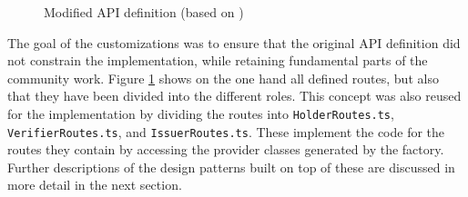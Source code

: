     \begin{figure}[ht]
        \centering
        \caption[Modified API definition]{Modified API definition (based on \cite{world_wide_web_consortium_credentials_community_group_vc_2021})}
        \label{figure: api definition}
    \end{figure}
    
    
    The goal of the customizations was to ensure that the original API definition did not constrain the implementation, while retaining fundamental parts of the community work. Figure \ref{figure: api definition} shows on the one hand all defined routes, but also that they have been divided into the different roles. This concept was also reused for the implementation by dividing the routes into \texttt{HolderRoutes.ts}, \texttt{VerifierRoutes.ts}, and \texttt{IssuerRoutes.ts}. These implement the code for the routes they contain by accessing the provider classes generated by the factory. Further descriptions of the design patterns built on top of these are discussed in more detail in the next section. 
    \vfill

        
